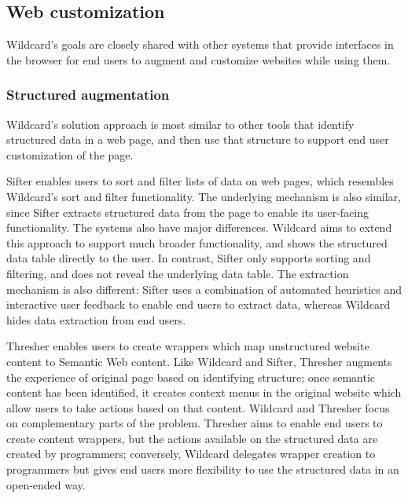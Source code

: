 \documentclass[english,submission]{programming}
\begin{document}
\hypertarget{web-customization}{%
\subsection{Web customization}\label{web-customization}}

Wildcard's goals are closely shared with other systems that provide
interfaces in the browser for end users to augment and customize
websites while using them.

\hypertarget{structured-augmentation}{%
\subsubsection{Structured augmentation}\label{structured-augmentation}}

Wildcard's solution approach is most similar to other tools that
identify structured data in a web page, and then use that structure to
support end user customization of the page.

Sifter \autocite{huynh2006} enables users to sort and filter lists of
data on web pages, which resembles Wildcard's sort and filter
functionality. The underlying mechanism is also similar, since Sifter
extracts structured data from the page to enable its user-facing
functionality. The systems also have major differences. Wildcard aims to
extend this approach to support much broader functionality, and shows
the structured data table directly to the user. In contrast, Sifter only
supports sorting and filtering, and does not reveal the underlying data
table. The extraction mechanism is also different: Sifter uses a
combination of automated heuristics and interactive user feedback to
enable end users to extract data, whereas Wildcard hides data extraction
from end users.

Thresher \autocite{hogue2005} enables users to create wrappers which map
unstructured website content to Semantic Web content. Like Wildcard and
Sifter, Thresher augments the experience of original page based on
identifying structure; once semantic content has been identified, it
creates context menus in the original website which allow users to take
actions based on that content. Wildcard and Thresher focus on
complementary parts of the problem. Thresher aims to enable end users to
create content wrappers, but the actions available on the structured
data are created by programmers; conversely, Wildcard delegates wrapper
creation to programmers but gives end users more flexibility to use the
structured data in an open-ended way.
\end{document}
